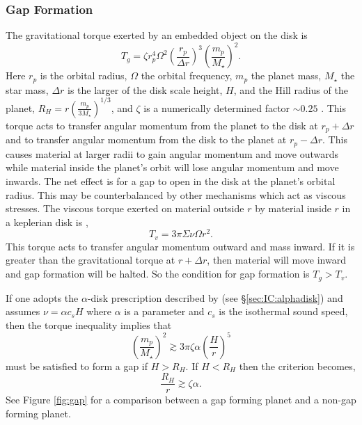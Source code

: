 \subsubsection{Gap Formation}

The gravitational torque exerted by an embedded object on the disk is
\begin{equation}
T_g=\zeta r_p^4\Omega^2\left(\frac{r_p}{\Delta r}\right)^3\left(\frac{m_p}{M_\star}\right)^2.
\end{equation}
Here $r_p$ is the orbital radius, $\Omega$ the orbital frequency, $m_p$ the planet mass, $M_\star$ the star mass, $\Delta r$ is the larger of the disk scale height, $H$, and the Hill radius of the planet, $R_H=r\left(\frac{m_p}{3M_\star}\right)^{1/3}$, and $\zeta$ is a numerically determined factor $\sim 0.25$ \citep{lin1979b,lin1979a,goldreich1980,lin1986}. This torque acts to transfer angular momentum from the planet to the disk at $r_p + \Delta r$ and to transfer angular momentum from the disk to the planet at $r_p - \Delta r$. This causes material at larger radii to gain angular momentum and move outwards while material inside the planet's orbit will lose angular momentum and move inwards. The net effect is for a gap to open in the disk at the planet's orbital radius. This may be counterbalanced by other mechanisms which act as viscous stresses. The viscous torque exerted on material outside $r$ by material inside $r$ in a keplerian disk is \citep{lyndenbell1974},
\begin{equation}
T_v = 3\pi \Sigma \nu \Omega r^2.
\label{eq:tvisc}
\end{equation}
This torque acts to transfer angular momentum outward and mass inward. If it is greater than the gravitational torque at $r+\Delta r$, then material will move inward and gap formation will be halted. So the condition for gap formation is $T_g > T_v$.

If one adopts the $\alpha$-disk prescription described by \citet{shakura1973} (see \S \ref{sec:IC:alphadisk}) and assumes $\nu = \alpha c_s H$ where $\alpha$ is a parameter and $c_s$ is the isothermal sound speed, then the torque inequality implies that 
\begin{equation}
\left(\frac{m_p}{M_\star}\right)^2 \gtrsim 3 \pi \zeta \alpha \left(\frac{H}{r}\right)^5
\label{eq:gapform1}
\end{equation}
must be satisfied to form a gap if $H>R_H$. If $H<R_H$ then the criterion becomes,
\begin{equation}
\frac{R_H}{r} \gtrsim \zeta \alpha.
\label{eq:gapform2}
\end{equation}
See Figure \ref{fig:gap} for a comparison between a gap forming planet and a non-gap forming planet.

